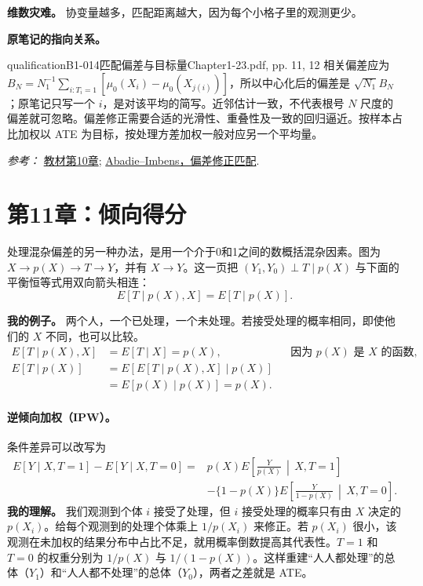 {\textbf{维数灾难。} 协变量越多，匹配距离越大，因为每个小格子里的观测更少。

\par{}\smallskip\textbf{原笔记的指向关系。}\par\smallskip
{}
\begin{reviewnote}{qualification}{B1-014}{匹配偏差与目标量}{Chapter1-23.pdf, pp. 11, 12}
相关偏差应为 $B_N=N_1^{-1}\sum_{i:T_i=1}[\mu_0(X_i)-\mu_0(X_{j(i)})]$，所以中心化后的偏差是 $\sqrt{N_1}B_N$；原笔记只写一个 $i$，是对该平均的简写。近邻估计一致，不代表根号 $N$ 尺度的偏差就可忽略。偏差修正需要合适的光滑性、重叠性及一致的回归逼近。按样本占比加权以 ATE 为目标，按处理方差加权一般对应另一个平均量。
\par\smallskip\textit{参考：} \href{https://matheusfacure.github.io/python-causality-handbook/10-Matching.html}{教材第10章}; \href{https://www.nber.org/papers/t0283}{Abadie--Imbens，偏差修正匹配}.
\end{reviewnote}
\section{第11章：倾向得分}
处理混杂偏差的另一种办法，是用一个介于0和1之间的数概括混杂因素。图为 $X\to p(X)\to T\to Y$，并有 $X\to Y$。这一页把 $(Y_1,Y_0)\perp T\mid p(X)$ 与下面的平衡恒等式用双向箭头相连：
\[E[T\mid p(X),X]=E[T\mid p(X)].\]


\textbf{我的例子。} 两个人，一个已处理，一个未处理。若接受处理的概率相同，即使他们的 $X$ 不同，也可以比较。
\begin{align*}
E[T\mid p(X),X]&=E[T\mid X]=p(X), &&\text{因为 }p(X)\text{ 是 }X\text{ 的函数},\\
E[T\mid p(X)]&=E[E[T\mid p(X),X]\mid p(X)]\\
&=E[p(X)\mid p(X)]=p(X).
\end{align*}

\paragraph{逆倾向加权（IPW）。}
条件差异可以改写为
\begin{align*}
E[Y\mid X,T=1]-E[Y\mid X,T=0]
={}&p(X)E\!\left[\frac{Y}{p(X)}\,\middle|\,X,T=1\right]\\
&-\{1-p(X)\}E\!\left[\frac{Y}{1-p(X)}\,\middle|\,X,T=0\right].
\end{align*}
\quad\textbf{我的理解。} 我们观测到个体 $i$ 接受了处理，但 $i$ 接受处理的概率只有由 $X$ 决定的 $p(X_i)$。给每个观测到的处理个体乘上 $1/p(X_i)$ 来修正。若 $p(X_i)$ 很小，该观测在未加权的结果分布中占比不足，就用概率倒数提高其代表性。$T=1$ 和 $T=0$ 的权重分别为 $1/p(X)$ 与 $1/(1-p(X))$。这样重建“人人都处理”的总体（$Y_1$）和“人人都不处理”的总体（$Y_0$），两者之差就是 ATE。

}
